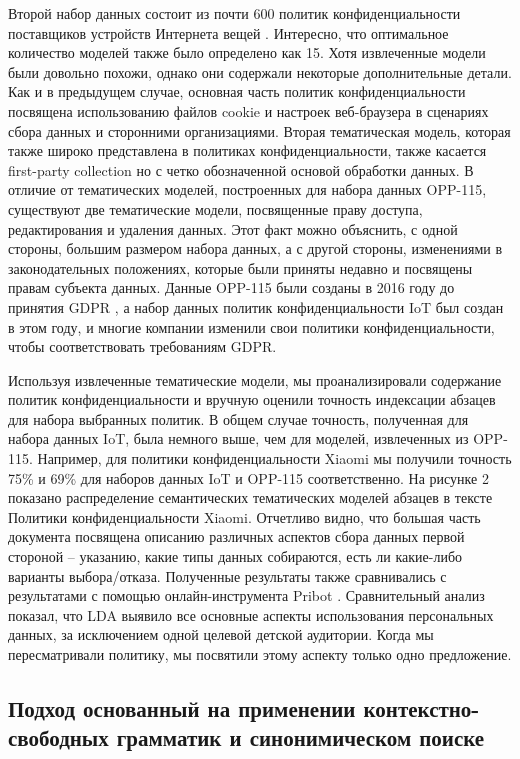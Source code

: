 \documentclass[../main]{subfiles}
\begin{document}
Второй набор данных состоит из почти 600 политик конфиденциальности поставщиков устройств Интернета вещей \cite{MDPI12}. Интересно, что оптимальное количество моделей также было определено как 15. Хотя извлеченные модели были довольно похожи, однако они содержали некоторые дополнительные детали. Как и в предыдущем случае, основная часть политик конфиденциальности посвящена использованию файлов cookie и настроек веб-браузера в сценариях сбора данных и сторонними организациями. Вторая тематическая модель, которая также широко представлена в политиках конфиденциальности, также касается first-party collection но с четко обозначенной основой обработки данных. В отличие от тематических моделей, построенных для набора данных OPP-115, существуют две тематические модели, посвященные праву доступа, редактирования и удаления данных. Этот факт можно объяснить, с одной стороны, большим размером набора данных, а с другой стороны, изменениями в законодательных положениях, которые были приняты недавно и посвящены правам субъекта данных. Данные OPP-115 были созданы в 2016 году до принятия GDPR \cite{GDPR}, а набор данных политик конфиденциальности IoT был создан в этом году, и многие компании изменили свои политики конфиденциальности, чтобы соответствовать требованиям GDPR.

Используя извлеченные тематические модели, мы проанализировали содержание политик конфиденциальности и вручную оценили точность индексации абзацев для набора выбранных политик. В общем случае точность, полученная для набора данных IoT, была немного выше, чем для моделей, извлеченных из OPP-115. Например, для политики конфиденциальности Xiaomi \cite{MDPI14} мы получили точность 75\% и 69\% для наборов данных IoT и OPP-115 соответственно. На рисунке 2 показано распределение семантических тематических моделей абзацев в тексте Политики конфиденциальности Xiaomi. Отчетливо видно, что большая часть документа посвящена описанию различных аспектов сбора данных первой стороной – указанию, какие типы данных собираются, есть ли какие-либо варианты выбора/отказа. Полученные результаты также сравнивались с результатами \cite{MDPI7} с помощью онлайн-инструмента Pribot \cite{MDPI15}. Сравнительный анализ показал, что LDA выявило все основные аспекты использования персональных данных, за исключением одной целевой детской аудитории. Когда мы пересматривали политику, мы посвятили этому аспекту только одно предложение.

\subsection{Подход основанный на применении контекстно-свободных грамматик и синонимическом поиске}
\end{document}

